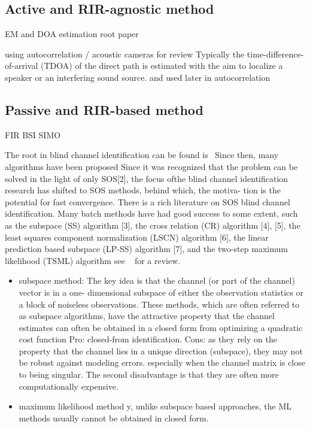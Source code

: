 \subsection{Active and RIR-agnostic method}
EM and DOA estimation  root paper

using autocorrelation / acoustic cameras
 for review Typically the time-difference-of-arrival (TDOA) of the direct path is estimated with the aim to localize a speaker or an interfering sound source.
 and used later in 
autocorrelation 


\subsection{Passive and RIR-based method}
FIR BSI SIMO

The root in blind channel identification can be found is~
Since then, many algorithms have been proposed
Since it was recognized that the problem can be solved in the light of only SOS[2], the focus ofthe blind channel identification research has shifted to SOS methods, behind which, the motiva- tion is the potential for fast convergence. There is a rich literature on SOS blind channel identification. Many batch methods have had good success to some extent, such as the subspace (SS) algorithm [3], the cross relation (CR) algorithm [4], [5], the least squares component normalization (LSCN) algorithm [6], the linear prediction based subspace (LP-SS) algorithm [7], and the two-step maximum likelihood (TSML) algorithm
see ~ for a review.
\begin{itemize}
    \item subspace method: The key idea is that the channel (or part of the channel) vector is in a one- dimensional subspace of either the observation statistics or a block of noiseless observations.
    These methods, which are often referred to as subspace algorithms, have the attractive property that the channel estimates can often be obtained in a closed form from optimizing a quadratic cost function
    Pro: closed-from identification.
    Cons: as they rely on the property that the channel lies in a unique direction (subspace), they may not be robust against modeling errors.
    especially when the channel matrix is close to being singular.
    The second disadvantage is that they are often more computationally expensive.
    \item maximum likelihood method y, unlike subspace based approaches, the ML methods usually cannot be obtained in closed form.
\end{itemize}

